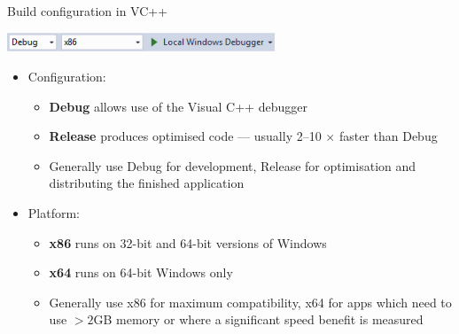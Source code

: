 \begin{frame}[fragile]{Build configuration in VC++}
    \begin{center}
        \includegraphics[width=0.6\textwidth]{vcpp_build_toolbar.PNG}
    \end{center}
    \begin{itemize}
        \item Configuration:
        \begin{itemize}
            \item \textbf{Debug} allows use of the Visual C++ debugger
            \item \textbf{Release} produces optimised code --- usually 2--10 $\times$ faster than Debug
            \item Generally use Debug for development, Release for optimisation and distributing the finished application
        \end{itemize}
        \item Platform:
        \begin{itemize}
            \item \textbf{x86} runs on 32-bit and 64-bit versions of Windows
            \item \textbf{x64} runs on 64-bit Windows only
            \item Generally use x86 for maximum compatibility, x64 for apps which need to use $>2$GB memory
                or where a significant speed benefit is measured
        \end{itemize}
    \end{itemize}
\end{frame}

